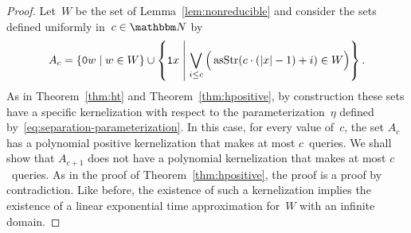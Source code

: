 \begin{proof}
  Let~$W$ be the set of Lemma~\ref{lem:nonreducible} and consider the sets defined uniformly in~$c \in \bbN$ by
  \begin{equation*}
    A_c \deq \{\bits{0}w \st w \in W\} \cup \left\{\bits{1}x \st[\middle] \bigvee_{i \le c} \Big(\asStr(c \cdot (\length{x} - 1) + i) \in W\Big)\right\}.
  \end{equation*}
  As in Theorem~\ref{thm:ht} and Theorem~\ref{thm:hpositive}, by construction these sets have a specific kernelization with respect to the parameterization~$\eta$ defined by~\eqref{eq:separation-parameterization}.
  In this case, for every value of~$c$, the set $A_c$ has a polynomial positive kernelization that makes at most $c$~queries.
  We shall show that $A_{c + 1}$ does not have a polynomial kernelization that makes at most $c$~queries.
  As in the proof of Theorem~\ref{thm:hpositive}, the proof is a proof by contradiction.
  Like before, the existence of such a kernelization implies the existence of a linear exponential time approximation for~$W$ with an infinite domain.


\end{proof}
